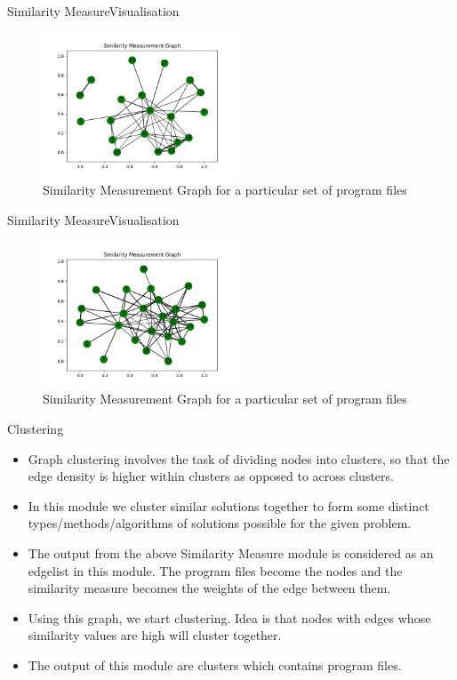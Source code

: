 \documentclass{beamer}
\begin{document}
\begin{frame}{Similarity Measure}{Visualisation}
     \begin{figure}[H]
            \centering
            \includegraphics[height=1.7in]{similarity_ensemble_old_frama_1.png}
            \caption*{Similarity Measurement Graph for a particular set of program files}
     \end{figure}
\end{frame}
\begin{frame}{Similarity Measure}{Visualisation}
     \begin{figure}
         \centering
         \includegraphics[height=1.7in]{similarity_ensemble_1.png}
         \caption*{Similarity Measurement Graph for a particular set of program files}
         \label{fig:my_label}
     \end{figure}
\end{frame}

\begin{frame}{Clustering}
\begin{itemize}
    \item Graph clustering involves the task of dividing nodes into clusters, so that the edge density is higher within clusters as opposed to across clusters.
    \item In this module we cluster similar solutions together to form some distinct types/methods/algorithms of solutions possible for the given problem.
    \item The output from the above Similarity Measure module is considered as an edgelist in this module. The program files become the nodes and the similarity measure becomes the weights of the edge between them.
    \item Using this graph, we start clustering. Idea is that nodes with edges whose similarity values are high will cluster together. 

    \item The output of this module are clusters which contains program files.
\end{itemize}

\end{frame}
\end{document}
